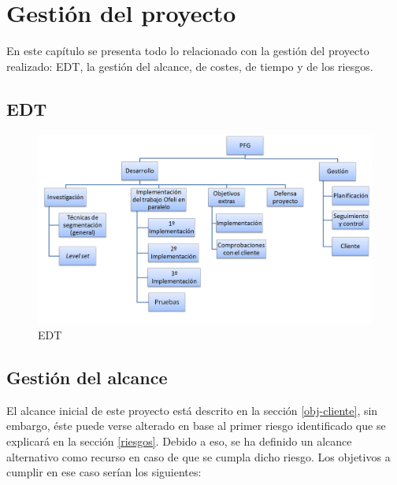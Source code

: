 \chapter{Gesti\'{o}n del proyecto}

En este cap\'{i}tulo se presenta todo lo relacionado con la gesti\'{o}n del proyecto realizado: EDT, la gesti\'{o}n del alcance, de costes, de tiempo y de los riesgos.

\section{EDT}

\begin{figure}[H]
	\captionsetup{justification=centering}
	\centering
	\includegraphics[width=1.2\textwidth]{./imagenes/EDT}
	\caption{EDT}	
	\label{EDT}
\end{figure}


\section{Gesti\'{o}n del alcance}\label{alcance}
 
El alcance inicial de este proyecto est\'{a} descrito en la secci\'{o}n \ref{obj-cliente}, sin embargo, \'{e}ste puede verse alterado en base al primer riesgo identificado que se explicar\'{a} en la secci\'{o}n \ref{riesgos}. Debido a eso, se ha definido un alcance alternativo como recurso en caso de que se cumpla dicho riesgo. Los objetivos a cumplir en ese caso ser\'{i}an los siguientes:

